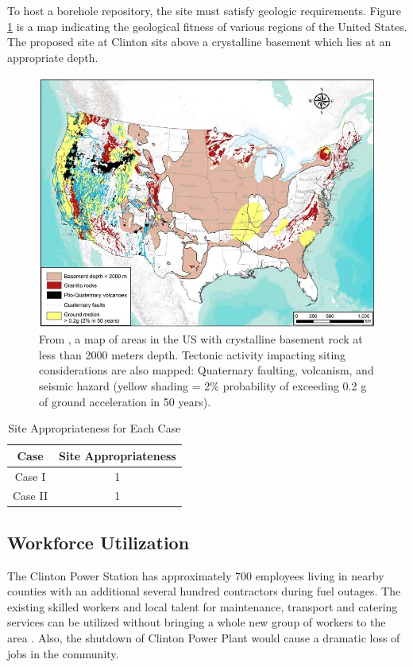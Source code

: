   To host a borehole repository, the site must satisfy geologic requirements. 
  Figure \ref{fig:cbrock} is a map indicating the geological fitness of various 
  regions of the United States. The proposed site at Clinton sits above 
  a crystalline basement which lies at an appropriate depth.

\begin{figure}[!h] 
  \centering
  \includegraphics[width=0.8\columnwidth]{cbrock.png}	
        \caption{From \cite{perry_gis_2015}, a map of areas in the US with 
        crystalline basement rock at less than 2000 meters depth. Tectonic 
        activity impacting siting considerations are also mapped:  Quaternary 
        faulting, volcanism, and seismic hazard (yellow shading = 2\% 
        probability of exceeding 0.2 g of ground acceleration in 50 years).}
  \label{fig:cbrock}
\end{figure}
 
  
\begin{table}[h]
	\centering
        \caption {Site Appropriateness for Each Case}
		\begin{tabular}{|c|c|}
			\hline
			Case & Site Appropriateness \\
			\hline
			Case I & 1 \\
			Case II & 1 \\
			\hline
                \end{tabular}
\end{table}

\subsection{Workforce Utilization}

The Clinton
 Power Station has approximately 700 employees living in nearby counties with an
additional several hundred contractors during fuel 
outages\cite{exelon_clinton_2016}.
The existing skilled workers and local talent for maintenance, transport and catering
services can be utilized without bringing a whole new group of workers to the 
area \cite{iaea_managing_2008}. Also, the shutdown of Clinton Power Plant would cause a dramatic
loss of jobs in the community. 

